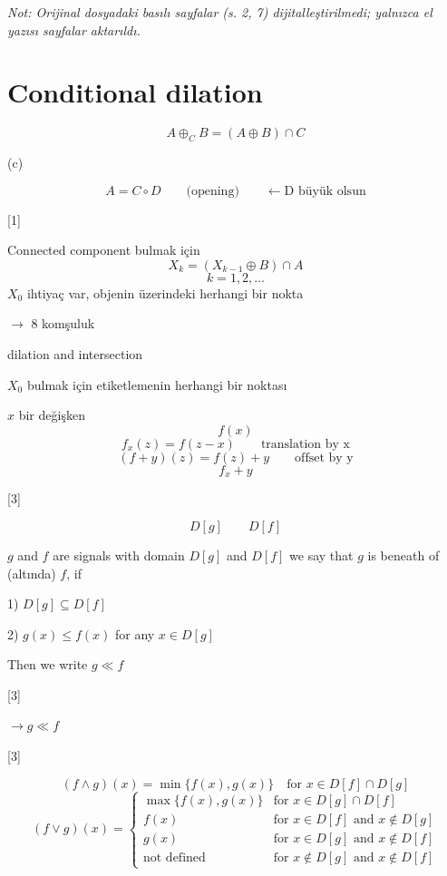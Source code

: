 \documentclass[11pt,a4paper]{article}
\begin{document}
\textit{Not: Orijinal dosyadaki basılı sayfalar (s. 2, 7) dijitalleştirilmedi; yalnızca el yazısı sayfalar aktarıldı.}

\section{Conditional dilation}
\[ A \oplus_C B = (A \oplus B) \cap C \]

(c)

\[ A = C \circ D \qquad \text{(opening)} \qquad \leftarrow \text{D büyük olsun} \]

[1]

Connected component bulmak için
\[ X_k = (X_{k-1} \oplus B) \cap A \]
\[ k = 1,2,\dots \]
$X_0$ ihtiyaç var, objenin üzerindeki herhangi bir nokta

$\rightarrow$ 8 komşuluk

dilation and intersection

$X_0$ bulmak için etiketlemenin herhangi bir noktası

$x$ bir değişken
\[ f(x) \]
\[ f_x(z) = f(z-x) \qquad \text{translation by x} \]
\[ (f+y)(z) = f(z)+y \qquad \text{offset by y} \]
\[ f_x + y \]

[3]

\[ D[g] \qquad D[f] \]

$g$ and $f$ are signals with domain $D[g]$ and $D[f]$ we say that $g$ is beneath of (altında) $f$, if

1) $D[g] \subseteq D[f]$

2) $g(x) \le f(x)$ for any $x \in D[g]$

Then we write $g \ll f$

[3]

$\rightarrow g \ll f$

[3]

\[ (f \wedge g)(x) = \min\{f(x), g(x)\} \quad \text{for } x \in D[f] \cap D[g] \]
\[ (f \vee g)(x) = \begin{cases}
\max\{f(x), g(x)\} & \text{for } x \in D[g] \cap D[f]\\
f(x) & \text{for } x \in D[f] \text{ and } x \notin D[g]\\
g(x) & \text{for } x \in D[g] \text{ and } x \notin D[f]\\
\text{not defined} & \text{for } x \notin D[g] \text{ and } x \notin D[f]
\end{cases} \]
\end{document}
